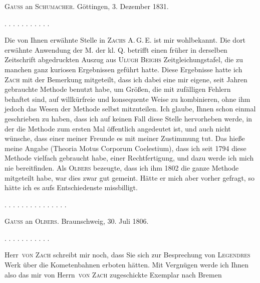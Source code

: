 \clearpage
{}
\begin{center}
\textsc{Gauss} an \textsc{Schumacher}. Göttingen, 3. Dezember 1831.
\end{center}

\begin{center}
. . . . . . . . . . .
\end{center}

Die von Ihnen erwähnte Stelle in \textsc{Zachs} A.\,G.\,E. ist mir wohlbekannt. Die dort erwähnte Anwendung der M. der kl. Q. betrifft einen früher in derselben Zeitschrift abgedruckten Auszug aus \textsc{Ulugh Beighs} Zeitgleichungstafel, die zu manchen ganz kuriosen Ergebnissen geführt hatte. Diese Ergebnisse hatte ich \textsc{Zach} mit der Bemerkung mitgeteilt, dass ich dabei eine mir eigene, seit Jahren gebrauchte Methode benutzt habe, um Größen, die mit zufälligen Fehlern behaftet sind, auf willkürfreie und konsequente Weise zu kombinieren, ohne ihm jedoch das Wesen der Methode selbst mitzuteilen. Ich glaube, Ihnen schon einmal geschrieben zu haben, dass ich auf keinen Fall diese Stelle hervorheben werde, in der die Methode zum ersten Mal öffentlich angedeutet ist, und auch nicht wünsche, dass einer meiner Freunde es mit meiner Zustimmung tut. Das hieße  meine Angabe (Theoria Motus Corporum Coelestium), dass ich seit 1794 diese Methode vielfach gebraucht habe, einer Rechtfertigung, und dazu werde ich mich nie bereitfinden. Als \textsc{Olbers} bezeugte, dass ich ihm 1802 die ganze Methode mitgeteilt habe, war dies zwar gut gemeint. Hätte er mich aber vorher gefragt, so hätte ich es aufs Entschiedenste missbilligt.

\begin{center}
. . . . . . . . . . . . . . .
\end{center}

\begin{center}
\textsc{Gauss} an \textsc{Olbers}. Braunschweig, 30. Juli 1806.
\end{center}

\begin{center}
. . . . . . . . . . .
\end{center}

Herr\ \textsc{von Zach} schreibt mir noch, dass Sie sich zur Besprechung von \textsc{Legendres} Werk über die Kometenbahnen erboten hätten. Mit Vergnügen werde ich Ihnen also das mir von Herrn\ \textsc{von Zach} zugeschickte Exemplar nach Bremen
